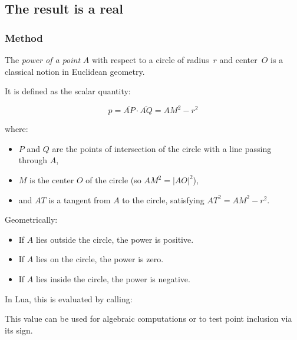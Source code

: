 
\subsection{The result is a real} %

\subsubsection{Method } %
\label{ssub:method_circle_power_pt}

The \emph{power of a point} $A$ with respect to a circle of radius~$r$ and center~$O$ is a classical notion in Euclidean geometry.

\medskip
\noindent
It is defined as the scalar quantity:

\[
p = \overline{AP} \cdot \overline{AQ} = AM^2 - r^2
\]

where:
\begin{itemize}
  \item $P$ and $Q$ are the points of intersection of the circle with a line passing through $A$,
  \item $M$ is the center $O$ of the circle (so $AM^2 = |AO|^2$),
  \item and $AT$ is a tangent from $A$ to the circle, satisfying $AT^2 = AM^2 - r^2$.
\end{itemize}

\noindent
Geometrically:
\begin{itemize}
  \item If $A$ lies outside the circle, the power is positive.
  \item If $A$ lies on the circle, the power is zero.
  \item If $A$ lies inside the circle, the power is negative.
\end{itemize}

\medskip
\noindent
In Lua, this is evaluated by calling:

\begin{center}
\end{center}

\noindent
This value can be used for algebraic computations or to test point inclusion via its sign.

\vspace{1em}

